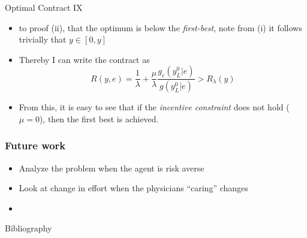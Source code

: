 \documentclass[compress]{beamer}
\begin{document}
\begin{frame}[c]{Optimal Contract IX}
  \begin{itemize}[<+- | alert@+>]
    \item to proof (ii), that the optimum is below the \emph{first-best}, note from (i) it follows trivially that $y\in [0,y]$
    \item Thereby I can write the contract as 
          \[
            R(y,e)=\frac{1}{\lambda}+\frac{\mu}{\lambda}\frac{g_e(y_L^0|e)}{g(y_L^0|e)}>R_\lambda(y)
          \]
    \item From this, it is easy to see that if the \emph{incentive constraint} does not hold ($\mu=0$), then the first best is achieved.
  \end{itemize}
\end{frame}

\begin{frame}[c]
  \frametitle{Future work}
  \begin{itemize}[<+- | alert@+>]
    \item Analyze the problem when the agent is risk averse
    \item Look at change in effort when the physicians ``caring'' changes
    \item 
  \end{itemize}
\end{frame}
\begin{frame}[c]{Bibliography}
  \printbibliography%
      
\end{frame}
\end{document}
